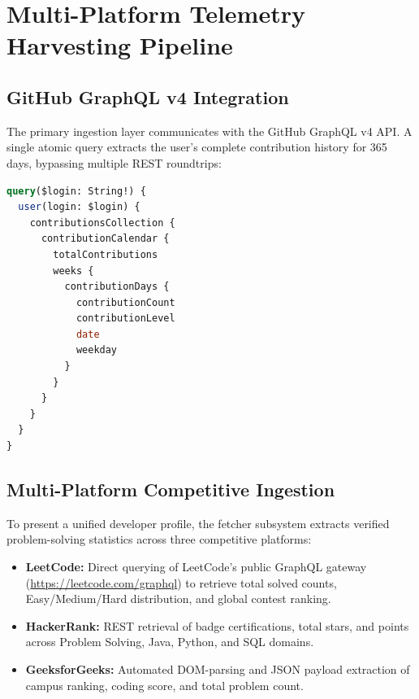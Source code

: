 \documentclass[12pt,a4paper]{report}
\begin{document}
\chapter{Multi-Platform Telemetry Harvesting Pipeline}

\section{GitHub GraphQL v4 Integration}
The primary ingestion layer communicates with the GitHub GraphQL v4 API. A single atomic query extracts the user's complete contribution history for 365 days, bypassing multiple REST roundtrips:

\begin{lstlisting}[language=SQL,caption={GraphQL Contribution Calendar Query}]
query($login: String!) {
  user(login: $login) {
    contributionsCollection {
      contributionCalendar {
        totalContributions
        weeks {
          contributionDays {
            contributionCount
            contributionLevel
            date
            weekday
          }
        }
      }
    }
  }
}
\end{lstlisting}

\section{Multi-Platform Competitive Ingestion}
To present a unified developer profile, the fetcher subsystem extracts verified problem-solving statistics across three competitive platforms:
\begin{itemize}
    \item \textbf{LeetCode:} Direct querying of LeetCode's public GraphQL gateway (\url{https://leetcode.com/graphql}) to retrieve total solved counts, Easy/Medium/Hard distribution, and global contest ranking.
    \item \textbf{HackerRank:} REST retrieval of badge certifications, total stars, and points across Problem Solving, Java, Python, and SQL domains.
    \item \textbf{GeeksforGeeks:} Automated DOM-parsing and JSON payload extraction of campus ranking, coding score, and total problem count.
\end{itemize}

\end{document}
